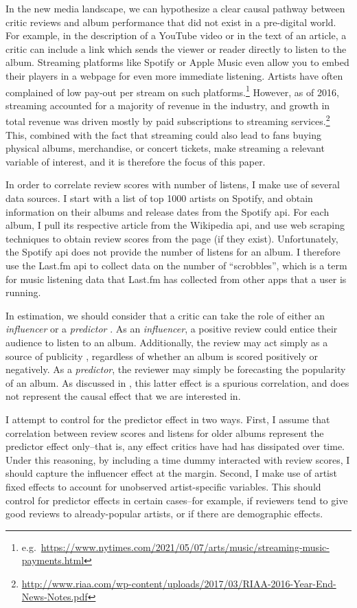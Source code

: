 \documentclass[
  11pt,
]{article}
\begin{document}
In the new media landscape, we can hypothesize a clear causal pathway
between critic reviews and album performance that did not exist in a
pre-digital world. For example, in the description of a YouTube video or
in the text of an article, a critic can include a link which sends the
viewer or reader directly to listen to the album. Streaming platforms
like Spotify or Apple Music even allow you to embed their players in a
webpage for even more immediate listening. Artists have often complained
of low pay-out per stream on such platforms.\footnote{e.g.~\url{https://www.nytimes.com/2021/05/07/arts/music/streaming-music-payments.html}}
However, as of 2016, streaming accounted for a majority of revenue in
the industry, and growth in total revenue was driven mostly by paid
subscriptions to streaming services.\footnote{\url{http://www.riaa.com/wp-content/uploads/2017/03/RIAA-2016-Year-End-News-Notes.pdf}}
This, combined with the fact that streaming could also lead to fans
buying physical albums, merchandise, or concert tickets, make streaming
a relevant variable of interest, and it is therefore the focus of this
paper.

In order to correlate review scores with number of listens, I make use
of several data sources. I start with a list of top 1000 artists on
Spotify, and obtain information on their albums and release dates from
the Spotify api. For each album, I pull its respective article from the
Wikipedia api, and use web scraping techniques to obtain review scores
from the page (if they exist). Unfortunately, the Spotify api does not
provide the number of listens for an album. I therefore use the Last.fm
api to collect data on the number of ``scrobbles'', which is a term for
music listening data that Last.fm has collected from other apps that a
user is running.

In estimation, we should consider that a critic can take the role of
either an \emph{influencer} or a \emph{predictor}
\citep{eliashberg1997film}. As an \emph{influencer}, a positive review
could entice their audience to listen to an album. Additionally, the
review may act simply as a source of publicity \citep{sorensen2004any},
regardless of whether an album is scored positively or negatively. As a
\emph{predictor}, the reviewer may simply be forecasting the popularity
of an album. As discussed in \citet{reinstein2005influence}, this latter
effect is a spurious correlation, and does not represent the causal
effect that we are interested in.

I attempt to control for the predictor effect in two ways. First, I
assume that correlation between review scores and listens for older
albums represent the predictor effect only--that is, any effect critics
have had has dissipated over time. Under this reasoning, by including a
time dummy interacted with review scores, I should capture the
influencer effect at the margin. Second, I make use of artist fixed
effects to account for unobserved artist-specific variables. This should
control for predictor effects in certain cases--for example, if
reviewers tend to give good reviews to already-popular artists, or if
there are demographic effects.
\end{document}
